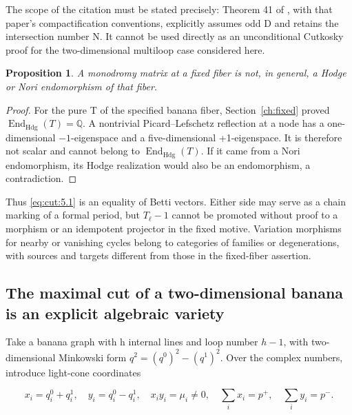 \documentclass[11pt,a4paper,oneside]{article}
\theoremstyle{plain}
\newtheorem{proposition}[theorem]{Proposition}
\theoremstyle{definition}
\theoremstyle{remark}
\numberwithin{equation}{section}
\begin{document}
The scope of the citation must be stated precisely: Theorem 41 of \cite{muhlbauer}, with that paper's compactification conventions, explicitly assumes odd D and retains the intersection number N. It cannot be used directly as an unconditional Cutkosky proof for the two-dimensional multiloop case considered here.

\begin{proposition}

\label{thm:cut:5.1} A monodromy matrix at a fixed fiber is not, in general, a Hodge or Nori endomorphism of that fiber.

\end{proposition}

\begin{proof}

For the pure T of the specified banana fiber, Section~\ref{ch:fixed} proved \(\operatorname{End}_{\mathrm{Hdg}}(T)=\mathbb Q\). A nontrivial Picard--Lefschetz reflection at a node has a one-dimensional \(- 1\)-eigenspace and a five-dimensional +1-eigenspace. It is therefore not scalar and cannot belong to \(\operatorname{End}_{\mathrm{Hdg}}(T)\). If it came from a Nori endomorphism, its Hodge realization would also be an endomorphism, a contradiction.

\end{proof}

Thus \eqref{eq:cut:5.1} is an equality of Betti vectors. Either side may serve as a chain marking of a formal period, but \(T_\ell - 1\) cannot be promoted without proof to a morphism or an idempotent projector in the fixed motive. Variation morphisms for nearby or vanishing cycles belong to categories of families or degenerations, with sources and targets different from those in the fixed-fiber assertion.


\subsection{The maximal cut of a two-dimensional banana is an explicit algebraic variety}\label{sec:cut:6}

Take a banana graph with h internal lines and loop number \(h- 1\), with two-dimensional Minkowski form \(q^{2}=(q^{0})^{2}- (q^{1})^{2}\). Over the complex numbers, introduce light-cone coordinates

\begin{equation}
x_i=q_i^0+q_i^1,\quad y_i=q_i^0-q_i^1,
 \quad x_iy_i=\mu_i\ne0,
 \quad\sum_i x_i=p^+,\quad\sum_i y_i=p^-.
\end{equation}
\end{document}
